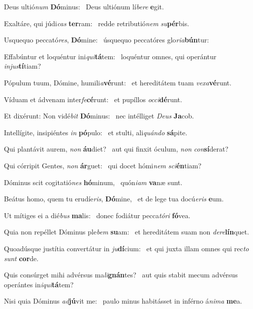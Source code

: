 \item Deus ultió\textit{num} \textbf{Dó}minus:~\psstar{} Deus ultiónum lí\textit{bere} \textbf{e}git.
\item Exaltáre, qui júdi\textit{cas} \textbf{ter}ram:~\psstar{} redde retributió\textit{nem} \textit{su}\textbf{pér}bis.
\item Usquequo peccató\textit{res}, \textbf{Dó}mine:~\psstar{} úsquequo peccatóres glo\textit{ria}\textbf{bún}tur:
\item Effabúntur et loquéntur ini\textit{qui}\textbf{tá}tem:~\psstar{} loquéntur omnes, qui operántur \textit{injus}\textbf{tí}tiam?
\item Pópulum tuum, Dómine, humili\textit{a}\textbf{vé}runt:~\psstar{} et hereditátem tuam \textit{vexa}\textbf{vé}runt.
\item Víduam et ádvenam inter\textit{fe}\-\textbf{cé}runt:~\psstar{} et pupíllos \textit{occi}\textbf{dé}runt.
\item Et dixérunt: Non vidé\textit{bit} \textbf{Dó}minus:~\psstar{} nec intélliget \textit{Deus} \textbf{Ja}cob.
\item Intellígite, insipiéntes \textit{in} \textbf{pó}pulo:~\psstar{} et stulti, ali\textit{quándo} \textbf{sá}pite.
\item Qui plantávit aurem, \textit{non} \textbf{áu}diet?~\psstar{} aut qui finxit óculum, \textit{non} \textit{con}\textbf{sí}derat?
\item Qui córripit Gentes, \textit{non} \textbf{ár}guet:~\psstar{} qui docet hómi\textit{nem} \textit{sci}\textbf{én}tiam?
\item Dóminus scit cogitatió\textit{nes} \textbf{hó}minum,~\psstar{} quón\textit{iam} \textbf{va}næ sunt.
\item Beátus homo, quem tu erudíe\textit{ris}, \textbf{Dó}mine,~\psstar{} et de lege tua docú\textit{eris} \textbf{e}um.
\item Ut mítiges ei a dié\textit{bus} \textbf{ma}lis:~\psstar{} donec fodiátur pecca\textit{tóri} \textbf{fó}vea.
\item Quia non repéllet Dóminus ple\textit{bem} \textbf{su}am:~\psstar{} et hereditátem suam non \textit{dere}\textbf{lín}quet.
\item Quoadúsque justítia convertátur in \textit{ju}\textbf{dí}cium:~\psstar{} et qui juxta illam omnes qui rec\textit{to} \textit{sunt} \textbf{cor}de.
\item Quis consúrget mihi advérsus ma\textit{li}\textbf{gnán}tes?~\psstar{} aut quis stabit mecum advérsus operántes in\textit{iqui}\textbf{tá}tem?
\item Nisi quia Dóminus \textit{ad}\textbf{jú}vit me:~\psstar{} paulo minus habitásset in inférno á\textit{nima} \textbf{me}a.
